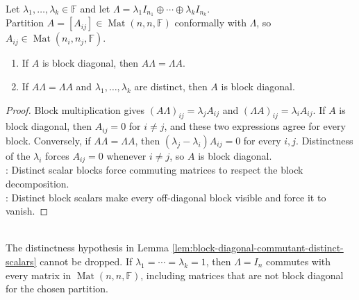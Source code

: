 \begin{lemma} \label{lem:block-diagonal-commutant-distinct-scalars} \\
Let $\lambda_1,\ldots,\lambda_k\in\mathbb{F}$ and let $\Lambda=\lambda_1 I_{n_1}\oplus\cdots\oplus\lambda_k I_{n_k}$.\\
Partition $A=[A_{ij}]\in\operatorname{Mat}(n,n,\mathbb{F})$ conformally with $\Lambda$, so $A_{ij}\in\operatorname{Mat}(n_i,n_j,\mathbb{F})$.
\begin{enumerate}[label=(\roman*)]
\setlength{\itemsep}{0pt}
\item If $A$ is block diagonal, then $A\Lambda=\Lambda A$.
\item If $A\Lambda=\Lambda A$ and $\lambda_1,\ldots,\lambda_k$ are distinct, then $A$ is block diagonal.
\end{enumerate}
\begin{proof}
Block multiplication gives $(A\Lambda)_{ij}=\lambda_jA_{ij}$ and $(\Lambda A)_{ij}=\lambda_iA_{ij}$. If $A$ is block diagonal, then $A_{ij}=0$ for $i\neq j$, and these two expressions agree for every block. Conversely, if $A\Lambda=\Lambda A$, then $(\lambda_j-\lambda_i)A_{ij}=0$ for every $i,j$. Distinctness of the $\lambda_i$ forces $A_{ij}=0$ whenever $i\neq j$, so $A$ is block diagonal.\\
: Distinct scalar blocks force commuting matrices to respect the block decomposition.\\
: Distinct block scalars make every off-diagonal block visible and force it to vanish.
\end{proof}
\end{lemma}

\begin{example} \\
The distinctness hypothesis in Lemma \ref{lem:block-diagonal-commutant-distinct-scalars} cannot be dropped. If $\lambda_1=\cdots=\lambda_k=1$, then $\Lambda=I_n$ commutes with every matrix in $\operatorname{Mat}(n,n,\mathbb{F})$, including matrices that are not block diagonal for the chosen partition.
\end{example}


